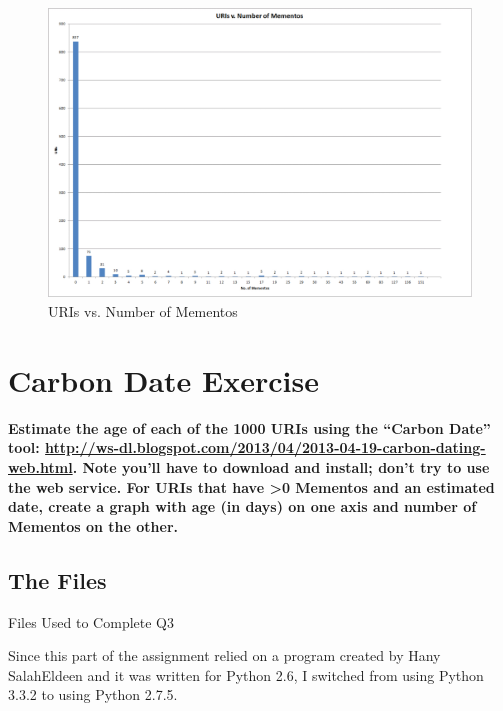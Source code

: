 \documentclass{article}
\begin{document}
\begin{figure}[H]
\centering
\includegraphics[scale=0.25]{q2/histogram}
\caption{URIs vs. Number of Mementos}
\label{urivmementos}
\end{figure}

\newpage


\section{Carbon Date Exercise}
\textbf{Estimate the age of each of the 1000 URIs using the ``Carbon Date'' tool: \url{http://ws-dl.blogspot.com/2013/04/2013-04-19-carbon-dating-web.html}. Note you'll have to download and install; don't try to use the web service. For URIs that have \textgreater  0 Mementos and an estimated date, create a graph with age (in days) on one axis and number of Mementos on the other.}

\subsection*{The Files}
Files Used to Complete Q3

Since this part of the assignment relied on a program created by Hany SalahEldeen and it was written for Python 2.6, I switched from using Python 3.3.2 to using Python 2.7.5.
\end{document}
